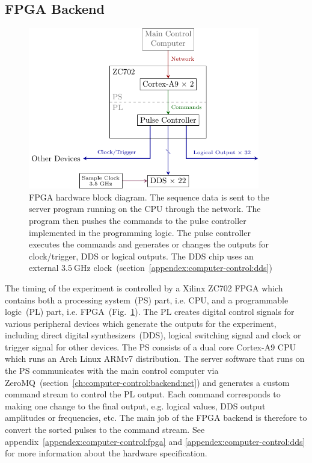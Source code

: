 \subsection{FPGA Backend}
\label{ch:computer-control:backend:fpga}
\begin{figure}
  \centering
  \includegraphics[width=0.9\textwidth]{figures/computer_control_backend_fpga.pdf}
  \caption[FPGA Block Diagram]{
    FPGA hardware block diagram.
    The sequence data is sent to the server program running on the CPU through the network.
    The program then pushes the commands to the pulse controller implemented
    in the programming logic.
    The pulse controller executes the commands and generates or changes the outputs
    for clock/trigger, DDS or logical outputs.
    The DDS chip uses an external $3.5~\mathrm{GHz}$
    clock~(section~\ref{appendex:computer-control:dds})
    \label{fig:computer-control:backend:fpga}}
\end{figure}
The timing of the experiment is controlled by a Xilinx ZC702 FPGA
which contains both a processing system~(PS) part, i.e. CPU,
and a programmable logic~(PL) part, i.e. FPGA~(Fig.~\ref{fig:computer-control:backend:fpga}).
The PL creates digital control signals for various peripheral devices
which generate the outputs for the experiment,
including direct digital synthesizers~(DDS), logical switching signal
and clock or trigger signal for other devices.
The PS consists of a dual core Cortex-A9 CPU
which runs an Arch Linux ARMv7 distribution.
The server software that runs on the PS communicates with the main control computer
via ZeroMQ~(section~\ref{ch:computer-control:backend:net})
and generates a custom command stream to control the PL output.
Each command corresponds to making one change to the final output, e.g.
logical values, DDS output amplitudes or frequencies, etc.
The main job of the FPGA backend is therefore to convert
the sorted pulses to the command stream.
See appendix~\ref{appendex:computer-control:fpga} and \ref{appendex:computer-control:dds}
for more information about the hardware specification.

